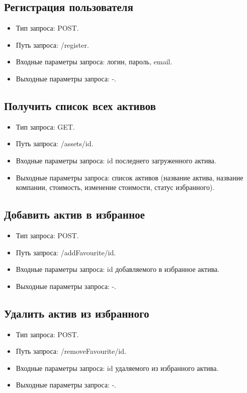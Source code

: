 \documentclass[a4paper, 14pt]{article}
\begin{document}
\subsection{Регистрация пользователя}

\begin{itemize}
    \item Тип запроса: POST.
    \item Путь запроса: /register.
    \item Входные параметры запроса: логин, пароль, email.
    \item Выходные параметры запроса: -.
\end{itemize}

\subsection{Получить список всех активов}

\begin{itemize}
    \item Тип запроса: GET.
    \item Путь запроса: /assets/{id}.
    \item Входные параметры запроса: id последнего загруженного актива.
    \item Выходные параметры запроса: список активов (название актива, название компании, стоимость, изменение стоимости, статус избранного).
\end{itemize}

\subsection{Добавить актив в избранное}

\begin{itemize}
    \item Тип запроса: POST.
    \item Путь запроса: /addFavourite/{id}.
    \item Входные параметры запроса: id добавляемого в избранное актива.
    \item Выходные параметры запроса: -.
\end{itemize}

\subsection{Удалить актив из избранного}

\begin{itemize}
    \item Тип запроса: POST.
    \item Путь запроса: /removeFavourite/{id}.
    \item Входные параметры запроса: id удаляемого из избранного актива.
    \item Выходные параметры запроса: -.
\end{itemize}
\end{document}
